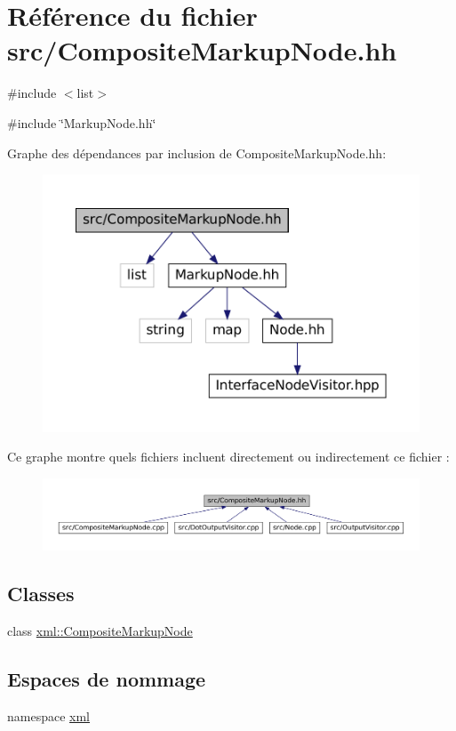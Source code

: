 \hypertarget{_composite_markup_node_8hh}{
\section{Référence du fichier src/CompositeMarkupNode.hh}
\label{_composite_markup_node_8hh}
}
{\ttfamily \#include $<$list$>$}\par
{\ttfamily \#include \char`\"{}MarkupNode.hh\char`\"{}}\par
Graphe des dépendances par inclusion de CompositeMarkupNode.hh:
\nopagebreak
\begin{figure}[H]
\begin{center}
\leavevmode
\includegraphics[width=400pt]{_composite_markup_node_8hh__incl}
\end{center}
\end{figure}
Ce graphe montre quels fichiers incluent directement ou indirectement ce fichier :
\nopagebreak
\begin{figure}[H]
\begin{center}
\leavevmode
\includegraphics[width=400pt]{_composite_markup_node_8hh__dep__incl}
\end{center}
\end{figure}
\subsection*{Classes}
\begin{DoxyCompactItemize}
\item 
class \hyperlink{classxml_1_1_composite_markup_node}{xml::CompositeMarkupNode}
\end{DoxyCompactItemize}
\subsection*{Espaces de nommage}
\begin{DoxyCompactItemize}
\item 
namespace \hyperlink{namespacexml}{xml}
\end{DoxyCompactItemize}
